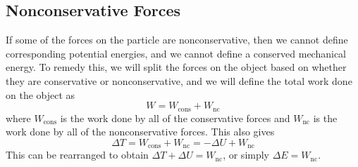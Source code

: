 \subsection*{Nonconservative Forces}
If some of the forces on the particle are nonconservative, then we cannot define corresponding potential energies, and we cannot define a conserved mechanical energy. To remedy this, we will split the forces on the object based on whether they are conservative or nonconservative, and we will define the total work done on the object as
\[ W = W_\text{cons} + W_\text{nc}\]
where $W_\text{cons}$ is the work done by all of the conservative forces and $W_\text{nc}$ is the work done by all of the nonconservative forces. This also gives
\[ \Delta T = W_\text{cons} + W_\text{nc} = -\Delta U + W_\text{nc} \]
This can be rearranged to obtain $\Delta T + \Delta U = W_\text{nc}$, or simply $\Delta E = W_\text{nc}$. 

